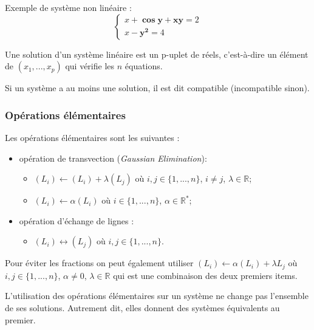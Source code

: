 {\begin{exemple}
Exemple de système non linéaire :
$$
\left\{
\begin{array}{l}
x+\mathbf{\cos y} + \mathbf{xy} =2 \\
x-\mathbf{y^2} = 4
\end{array}
\right.$$

\end{exemple}

\begin{defi}
Une solution d'un système linéaire est un p-uplet de réels, c'est-à-dire un élément de $(x_1,...,x_p)$ qui vérifie les $n$ équations. 
\end{defi}


\begin{defi}
Si un système a au moins une solution, il est dit compatible (incompatible sinon).
\end{defi}


\subsubsection{Opérations élémentaires}
\begin{defi}
Les opérations élémentaires sont les suivantes :
\begin{itemize}
\item opération de transvection (\textit{Gaussian Elimination}): 
\begin{itemize}
\item $(L_i)\leftarrow (L_i)+\lambda (L_j)$ où $i,j\in \{1,...,n\}$, $i\neq j$, $\lambda \in \mathbb{R}$;
\item $(L_i)\leftarrow \alpha (L_i)$ où $i\in \{1,...,n\}$, $\alpha \in \mathbb{R}^*$;
\end{itemize}
\item opération d'échange de lignes : 
\begin{itemize}
\item $(L_i)\leftrightarrow  (L_j)$ où $i,j\in \{1,...,n\}$. 
\end{itemize}
\end{itemize}
\end{defi}

\begin{remarque}
Pour éviter les fractions on peut également utiliser $(L_i)\leftarrow \alpha (L_i) + \lambda L_j$ où $i,j\in \{1,...,n\}$, $\alpha \neq 0$, $\lambda \in \mathbb{R}$ qui est une combinaison des deux premiers items.
\end{remarque}

\begin{proposition}
L'utilisation des opérations élémentaires sur un système ne change pas l'ensemble de ses solutions. Autrement dit, elles donnent des systèmes équivalents au premier.
\end{proposition}

}
